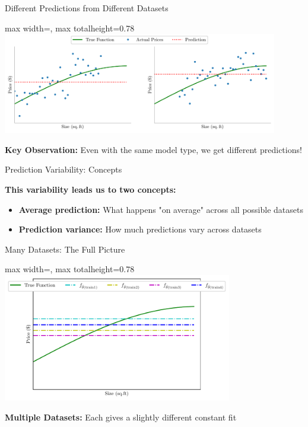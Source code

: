 \documentclass[10pt]{beamer}
\newcommand{\fitpic}[1]{\begin{adjustbox}{max width=\linewidth, max totalheight=0.78\textheight}#1\end{adjustbox}}
\begin{document}
\begin{frame}{Different Predictions from Different Datasets}
\footnotesize
\begin{center}
\fitpic{\includegraphics[width=0.9\textwidth]{../assets/bias-variance/figures/bias3.pdf}}
\end{center}

\begin{alertbox}
\raggedright
\textbf{Key Observation:} Even with the same model type, we get different predictions!
\end{alertbox}
\end{frame}

\begin{frame}{Prediction Variability: Concepts}
\footnotesize
\begin{definitionbox}
\raggedright
\textbf{This variability leads us to two concepts:}
\begin{itemize}
\item \textbf{Average prediction:} What happens "on average" across all possible datasets
\item \textbf{Prediction variance:} How much predictions vary across datasets
\end{itemize}
\end{definitionbox}
\end{frame}

\begin{frame}{Many Datasets: The Full Picture}
\footnotesize
\begin{center}
\fitpic{\includegraphics[width=0.75\textwidth]{../assets/bias-variance/figures/bias4.pdf}}
\end{center}

\begin{keypointsbox}
\raggedright
\textbf{Multiple Datasets:} Each gives a slightly different constant fit
\end{keypointsbox}
\end{frame}
\end{document}
